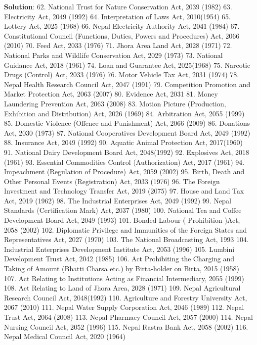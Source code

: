\documentclass[
  openany]{book}
\newenvironment{solution}{ {\bfseries Solution}:}{}
\begin{document}
\begin{questions}
\begin{solution}
62. National Trust for Nature Conservation Act, 2039 (1982)
63. Electricity Act, 2049 (1992)
64. Interpretation of Laws Act, 2010(1954)
65. Lottery Act, 2025 (1968)
66. Nepal Electricity Authority Act, 2041 (1984)
67. Constitutional Council (Functions, Duties, Powers and Procedures) Act, 2066 (2010)
70. Feed Act, 2033 (1976)
71. Jhora Area Land Act, 2028 (1971)
72. National Parks and Wildlife Conservation Act, 2029 (1973)
73. National Guidance Act, 2018 (1961)
74. Loan and Guarantee Act, 2025(1968)
75. Narcotic Drugs (Control) Act, 2033 (1976)
76. Motor Vehicle Tax Act, 2031 (1974)
78. Nepal Health Research Council Act, 2047 (1991)
79. Competition Promotion and Market Protection Act, 2063 (2007)
80. Evidence Act, 2031
81. Money Laundering Prevention Act, 2063 (2008)
83. Motion Picture (Production, Exhibition and Distribution) Act, 2026 (1969)
84. Arbitration Act, 2055 (1999)
85. Domestic Violence (Offence and Punishment) Act, 2066 (2009)
86. Donations Act, 2030 (1973)
87. National Cooperatives Development Board Act, 2049 (1992)
88. Insurance Act, 2049 (1992)
90. Aquatic Animal Protection Act, 2017(1960)
91. National Dairy Development Board Act, 2048(1992)
92. Explosives Act, 2018 (1961)
93. Essential Commodities Control (Authorization) Act, 2017 (1961)
94. Impeachment (Regulation of Procedure) Act, 2059 (2002)
95. Birth, Death and Other Personal Events (Registration) Act, 2033 (1976)
96. The Foreign Investment and Technology Transfer Act, 2019 (2075)
97. House and Land Tax Act, 2019 (1962)
98. The Industrial Enterprises Act, 2049 (1992)
99. Nepal Standards (Certification Mark) Act, 2037 (1980)
100. National Tea and Coffee Development Board Act, 2049 (1993)
101. Bonded Labour ( Prohibition )Act, 2058 (2002)
102. Diplomatic Privilege and Immunities of the Foreign States and Representatives Act, 2027 (1970)
103. The National Broadcasting Act, 1993
104. Industrial Enterprises Development Institute Act, 2053 (1996)
105. Lumbini Development Trust Act, 2042 (1985)
106. Act Prohibiting the Charging and Taking of Amount (Bhatti Charsa etc.) by Birta-holder on Birta, 2015 (1958)
107. Act Relating to Institutions Acting as Financial Intermediary, 2055 (1999)
108. Act Relating to Land of Jhora Area, 2028 (1971)
109. Nepal Agricultural Research Council Act, 2048(1992)
110. Agriculture and Forestry University Act, 2067 (2010)
111. Nepal Water Supply Corporation Act, 2046 (1989)
112. Nepal Trust Act, 2064 (2008)
113. Nepal Pharmacy Council Act, 2057 (2000)
114. Nepal Nursing Council Act, 2052 (1996)
115. Nepal Rastra Bank Act, 2058 (2002)
116. Nepal Medical Council Act, 2020 (1964)

\end{solution}
\end{questions}
\end{document}
